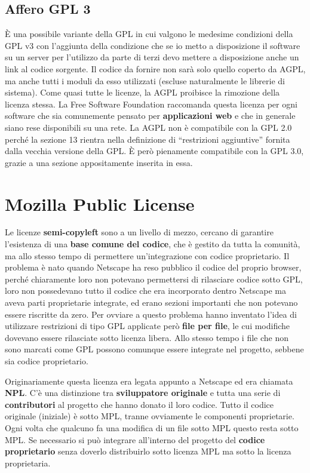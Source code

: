 \subsection{Affero GPL 3}

È una possibile variante della GPL in cui valgono le medesime condizioni della GPL v3 con l'aggiunta della condizione che se io metto a disposizione il software su un server per l'utilizzo da parte di terzi devo mettere a disposizione anche un link al codice sorgente. Il codice da fornire non sarà solo quello coperto da AGPL, ma anche tutti i moduli da esso utilizzati (escluse naturalmente le librerie di sistema). Come quasi tutte le licenze, la AGPL proibisce la rimozione della licenza stessa. La Free Software Foundation raccomanda questa licenza per ogni software che sia comunemente pensato per \textbf{applicazioni web} e che in generale siano rese disponibili su una rete. La AGPL non è compatibile con la GPL 2.0 perché la sezione 13 rientra nella definizione di ``restrizioni aggiuntive'' fornita dalla vecchia versione della GPL. È però pienamente compatibile con la GPL 3.0, grazie a una sezione appositamente inserita in essa.

\section{Mozilla Public License}

Le licenze \textbf{semi-copyleft} sono a un livello di mezzo, cercano di garantire l'esistenza di una \textbf{base comune del codice}, che è gestito da tutta la comunità, ma allo stesso tempo di permettere un'integrazione con codice proprietario. Il problema è nato quando Netscape ha reso pubblico il codice del proprio browser, perché chiaramente loro non potevano permettersi di rilasciare codice sotto GPL, loro non possedevano tutto il codice che era incorporato dentro Netscape ma aveva parti proprietarie integrate, ed erano sezioni importanti che non potevano essere riscritte da zero. Per ovviare a questo problema hanno inventato l'idea di utilizzare restrizioni di tipo GPL applicate però \textbf{file per file}, le cui modifiche dovevano essere rilasciate sotto licenza libera. Allo stesso tempo i file che non sono marcati come GPL possono comunque essere integrate nel progetto, sebbene sia codice proprietario.

Originariamente questa licenza era legata appunto a Netscape ed era chiamata \textbf{NPL}. C'è una distinzione tra \textbf{sviluppatore originale} e tutta una serie di \textbf{contributori} al progetto che hanno donato il loro codice. Tutto il codice originale (iniziale) è sotto MPL, tranne ovviamente le componenti proprietarie. Ogni volta che qualcuno fa una modifica di un file sotto MPL questo resta sotto MPL. Se necessario si può integrare all'interno del progetto del \textbf{codice proprietario} senza doverlo distribuirlo sotto licenza MPL ma sotto la licenza proprietaria.


